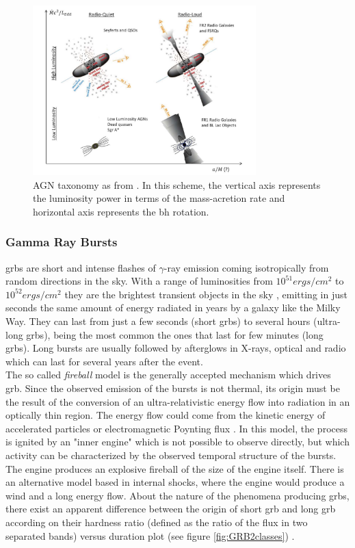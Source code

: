 \documentclass[main.tex]{subfiles}
\begin{document}
\begin{figure}
\centering
 \includegraphics[width=0.77\textwidth]{Pictures/schemeAGN.pdf}
  \caption{AGN taxonomy as from \cite{2016AGNsingammarays}. In this scheme, the vertical axis represents the luminosity power in terms of the mass-acretion rate and horizontal axis represents the \gls{bh} rotation.} 
    \label{fig:schemeAGN}
\end{figure}

\subsubsection{Gamma Ray Bursts}

\glspl{grb} are short and intense flashes of $\gamma$-ray emission coming isotropically from random directions in the sky. With a range of luminosities from $10^{51} ergs/cm^2$ to $10^{52} ergs/cm^2$ they are the brightest transient objects in the sky \cite{2004GRB}, emitting in just seconds the same amount of energy radiated in years by a galaxy like the Milky Way. They can last from just a few seconds (short \glspl{grb}) to several hours (ultra-long \glspl{grb}), being the most common the ones that last for few minutes (long \glspl{grb}). Long bursts are usually followed by afterglows in X-rays, optical and radio which can last for several years after the event. \\
The so called \textit{fireball} model is the generally accepted mechanism which drives \gls{grb}. Since the observed emission of the bursts is not thermal, its origin must be the result of the conversion of an ultra-relativistic  energy flow into radiation in an optically thin region. The energy flow could come from the kinetic energy of accelerated particles or electromagnetic Poynting flux \cite{1999GRBfireball}. In this model, the process is ignited by an "inner engine" which is not possible to observe directly, but which activity can be characterized by the observed temporal structure of the bursts. The engine produces an explosive fireball of the size of the engine itself. There is an alternative model based in internal shocks, where the engine would produce a wind and a long energy flow. About the nature of the phenomena producing \glspl{grb}, there exist an apparent difference between the origin of short \gls{grb} and long \gls{grb} according on their hardness ratio (defined as the ratio of the flux in two separated bands) versus duration plot (see figure \ref{fig:GRB2classes}) \cite{1993GRB2pop}.\\
\end{document}
